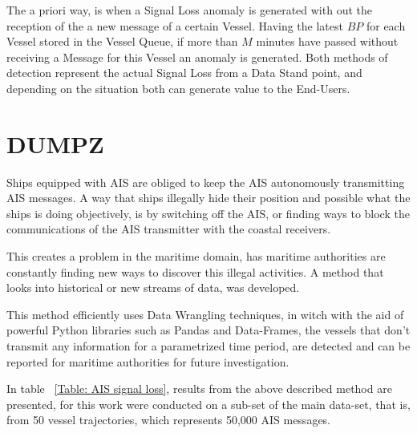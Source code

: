 The a priori way, is when a Signal Loss anomaly is generated with out the reception of the a new message of a certain Vessel. Having the latest $BP$ for each Vessel stored in the Vessel Queue, if more than $M$ minutes have passed without receiving a Message for this Vessel an anomaly is generated. Both methods of detection represent the actual Signal Loss from a Data Stand point, and depending on the situation both can generate value to the End-Users. 

\iffalse
\section{DUMPZ}

Ships equipped with AIS are obliged to keep the AIS autonomously transmitting AIS messages. A way that ships illegally hide their position and possible what the ships is doing objectively, is by switching off the AIS, or finding ways to block the communications of the AIS transmitter with the coastal receivers.

This creates a problem in the maritime domain, has maritime authorities are constantly finding new ways to discover this illegal activities. A method that looks into historical or new streams of data, was developed. 

This method efficiently uses Data Wrangling techniques, in witch with the aid of powerful Python libraries such as Pandas and Data-Frames, the vessels that don't transmit any information for a parametrized time period, are detected and can be reported for maritime authorities for future investigation.

In table ~\ref{Table: AIS signal loss}, results from the above described method are presented, for this work were conducted on a sub-set of the main data-set, that is, from 50 vessel trajectories, which represents 50,000 AIS messages.

